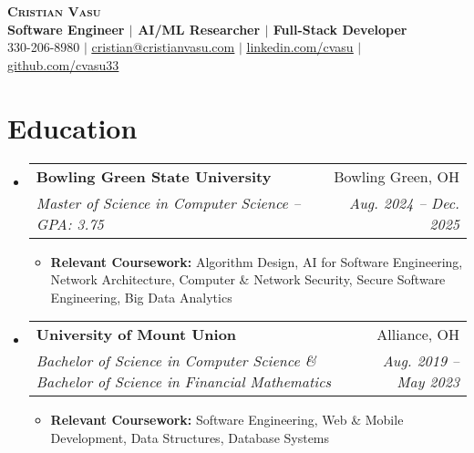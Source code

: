 \documentclass[letterpaper,11pt]{article}
\makeatletter
\newcommand{\resumeItem}[1]{
  \item\small{
    {#1 \vspace{-2pt}}
  }
}
\newcommand{\resumeSubheading}[4]{
  \vspace{-2pt}\item
    \begin{tabular*}{0.97\textwidth}[t]{l@{\extracolsep{\fill}}r}
      \textbf{#1} & #2 \\
      \textit{\small#3} & \textit{\small #4} \\
    \end{tabular*}\vspace{-7pt}
}
\newcommand{\resumeSubHeadingListStart}{\begin{itemize}[leftmargin=0.15in, label={}]}
\newcommand{\resumeSubHeadingListEnd}{\end{itemize}}
\newcommand{\resumeItemListStart}{\begin{itemize}}
\newcommand{\resumeItemListEnd}{\end{itemize}\vspace{-5pt}}
\makeatother
\begin{document}

\begin{center}
    \textbf{\Huge \scshape Cristian Vasu} \\ 
    \vspace{2pt}
    \textbf{Software Engineer $|$ AI/ML Researcher $|$ Full-Stack Developer} \\
    \vspace{1pt}
    \small 330-206-8980 $|$ \href{mailto:cristian@cristianvasu.com}{\uline{{cristian@cristianvasu.com}}} $|$ 
    \href{https://www.linkedin.com/in/cvasu}{\uline{linkedin.com/cvasu}} $|$
    \href{https://github.com/cvasu33}{\uline{github.com/cvasu33}}
\end{center}

\vspace{-1em}
\section{Education}
  \resumeSubHeadingListStart
    \resumeSubheading
      {Bowling Green State University}{Bowling Green, OH}
      {Master of Science in Computer Science -- \textit{GPA: 3.75}}{Aug. 2024 -- Dec. 2025} 
    \resumeItemListStart
    \resumeItem{\textbf{Relevant Coursework:} Algorithm Design, AI for Software Engineering, Network Architecture, Computer \& Network Security, Secure Software Engineering, Big Data Analytics}
    \resumeItemListEnd
    
    \resumeSubheading
      {University of Mount Union}{Alliance, OH}
      {Bachelor of Science in Computer Science \& Bachelor of Science in Financial Mathematics}{Aug. 2019 -- May 2023}
    \resumeItemListStart
    \resumeItem{\textbf{Relevant Coursework:} Software Engineering, Web \& Mobile Development, Data Structures, Database Systems}
    \resumeItemListEnd
  \resumeSubHeadingListEnd

\end{document}
